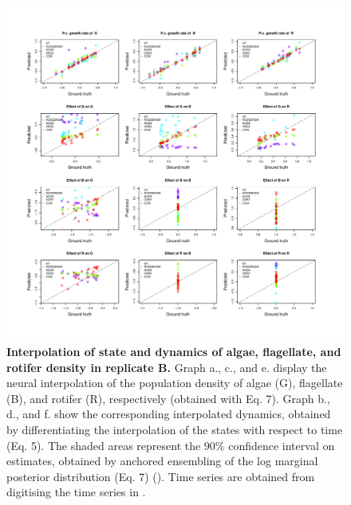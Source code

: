 \documentclass[11pt, oneside]{article}
\begin{document}
\begin{figure}[H]
\includegraphics[width=1\linewidth,page=12]{figures/figures_supplementary.pdf}
\caption{
    \textbf{Interpolation of state and dynamics of algae, flagellate, and rotifer density in replicate B.}
    Graph a., c., and e. display the neural interpolation of the population density of algae (G), flagellate (B), and rotifer (R), respectively (obtained with Eq. 7). 
    Graph b., d., and f. show the corresponding interpolated dynamics, obtained by differentiating the interpolation of the states with respect to time (Eq. 5).
    The shaded areas represent the 90\% confidence interval on estimates, obtained by anchored ensembling of the log marginal posterior distribution (Eq. 7) (\cite{Pearce2018}).
    Time series are obtained from digitising the time series in \cite{Hiltunen2013}.
}
\end{figure}
\newpage
\end{document}
